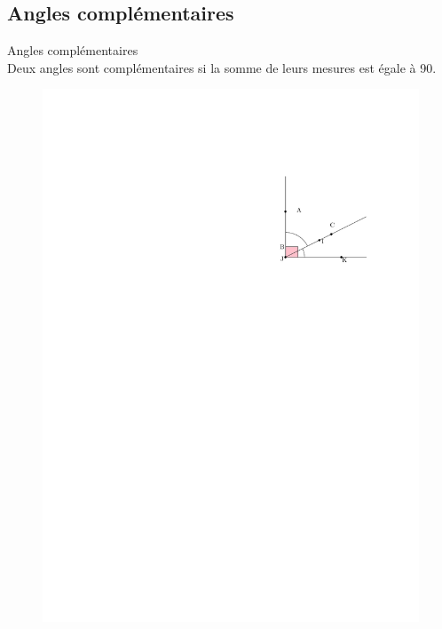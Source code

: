 \documentclass[12pt]{article}
\begin{document}
\subsection*{Angles complémentaires}
\begin{multicols}{2}

  \begin{Definition}{Angles complémentaires}\\
    Deux angles sont complémentaires si la somme de leurs mesures est égale à 90.
  \end{Definition}
  \begin{figure}[H]
    \centering
    \includegraphics[width=0.6\linewidth]{5x10-angles/sources/complementaires.pdf}
  \end{figure}
\end{multicols}
\end{document}
